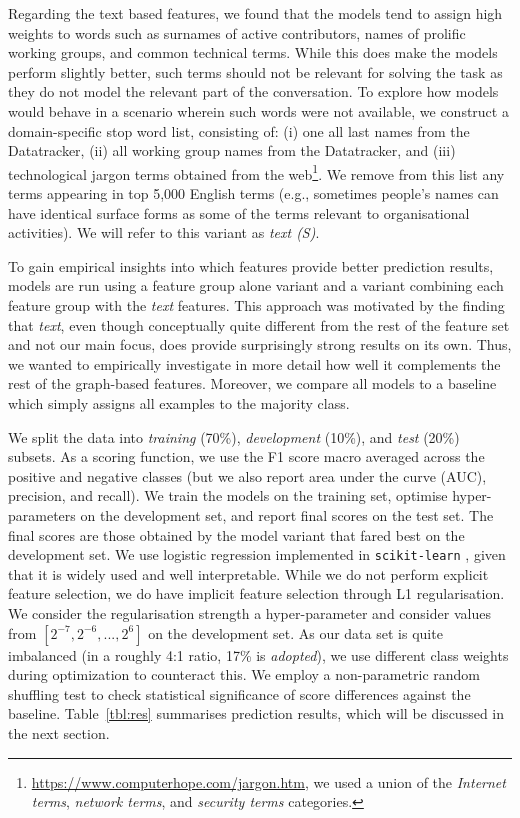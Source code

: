 \documentclass[twocolumn,10pt]{article}
\begin{document}
Regarding the text based features, we found that the models tend to assign
high weights to words such as surnames of active contributors, names of
prolific working groups, and common technical terms. While this does make
the models perform slightly better, such terms should not be relevant for
solving the task as they do not model the relevant part of the conversation.
To explore how models would behave in a scenario wherein such words were
not available, we construct a domain-specific stop word list, consisting
of: (i) one all last names from the Datatracker, (ii) all working group
names from the Datatracker, and (iii) technological jargon terms obtained
from the web\footnote{\url{https://www.computerhope.com/jargon.htm}, we
used a union of the \emph{Internet terms}, \emph{network terms}, and
\emph{security terms} categories.}. We remove from this list any terms
appearing in top 5,000 English terms (e.g., sometimes people's names can have
identical surface forms as some of the terms relevant to organisational
activities). We will refer to this variant as \emph{text (S)}. 


To gain empirical insights into which features provide better prediction
results, models are run using a feature group alone variant and a variant
combining each feature group with the \emph{text} features. This approach
was motivated by the finding that \emph{text}, even though conceptually
quite different from the rest of the feature set and not our main focus,
does provide surprisingly strong results on its own. Thus, we wanted to
empirically investigate in more detail how well it complements the rest of
the graph-based features. Moreover, we compare all models to a baseline
which simply assigns all examples to the majority class.

We split the data into \emph{training} (70\%), \emph{development} (10\%),
and \emph{test} (20\%) subsets. As a scoring function, we use the F1 score
macro averaged across the positive and negative classes (but we also report
area under the curve (AUC), precision, and recall). We train the models on
the training set, optimise hyper-parameters on the development set, and
report final scores on the test set. The final scores are those obtained by
the model variant that fared best on the development set. We use logistic
regression implemented in \texttt{scikit-learn} \cite{scikit-learn}, given
that it is widely used and well interpretable. While we do not perform
explicit feature selection, we do have implicit feature selection through
L1 regularisation. We consider the regularisation strength a hyper-parameter
and consider values from $[2^{-7}, 2^{-6}, ..., 2^6]$ on the development
set. As our data set is quite imbalanced (in a roughly 4:1 ratio, 17\% is
\emph{adopted}), we use different class weights during optimization to
counteract this. We employ a non-parametric random shuffling test
\cite{yeh-2000-accurate} to check statistical significance of score
differences against the baseline. Table~\ref{tbl:res} summarises prediction
results, which will be discussed in the next section. 
\end{document}
